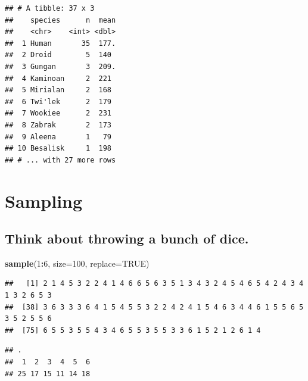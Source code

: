 \documentclass[]{book}
\newenvironment{Shaded}{\begin{snugshade}}{\end{snugshade}}
\newcommand{\DataTypeTok}[1]{\textcolor[rgb]{0.13,0.29,0.53}{#1}}
\newcommand{\DecValTok}[1]{\textcolor[rgb]{0.00,0.00,0.81}{#1}}
\newcommand{\KeywordTok}[1]{\textcolor[rgb]{0.13,0.29,0.53}{\textbf{#1}}}
\newcommand{\NormalTok}[1]{#1}
\newcommand{\OperatorTok}[1]{\textcolor[rgb]{0.81,0.36,0.00}{\textbf{#1}}}
\newcommand{\OtherTok}[1]{\textcolor[rgb]{0.56,0.35,0.01}{#1}}
\newcommand{\StringTok}[1]{\textcolor[rgb]{0.31,0.60,0.02}{#1}}
\begin{document}
\begin{verbatim}
## # A tibble: 37 x 3
##    species      n  mean
##    <chr>    <int> <dbl>
##  1 Human       35  177.
##  2 Droid        5  140 
##  3 Gungan       3  209.
##  4 Kaminoan     2  221 
##  5 Mirialan     2  168 
##  6 Twi'lek      2  179 
##  7 Wookiee      2  231 
##  8 Zabrak       2  173 
##  9 Aleena       1   79 
## 10 Besalisk     1  198 
## # ... with 27 more rows
\end{verbatim}

\hypertarget{sampling}{%
\chapter{Sampling}\label{sampling}}

\hypertarget{think-about-throwing-a-bunch-of-dice.}{%
\section{Think about throwing a bunch of dice.}\label{think-about-throwing-a-bunch-of-dice.}}

\begin{Shaded}
\begin{Highlighting}[]
\KeywordTok{sample}\NormalTok{(}\DecValTok{1}\OperatorTok{:}\DecValTok{6}\NormalTok{, }\DataTypeTok{size=}\DecValTok{100}\NormalTok{, }\DataTypeTok{replace=}\OtherTok{TRUE}\NormalTok{) }
\end{Highlighting}
\end{Shaded}

\begin{verbatim}
##   [1] 2 1 4 5 3 2 2 4 1 4 6 6 5 6 3 5 1 3 4 3 2 4 5 4 6 5 4 2 4 3 4 1 3 2 6 5 3
##  [38] 3 6 3 3 3 6 4 1 5 4 5 5 3 2 2 4 2 4 1 5 4 6 3 4 4 6 1 5 5 6 5 3 5 2 5 5 6
##  [75] 6 5 5 3 5 5 4 3 4 6 5 5 3 5 5 3 3 6 1 5 2 1 2 6 1 4
\end{verbatim}

\begin{Shaded}
\end{Shaded}

\begin{verbatim}
## .
##  1  2  3  4  5  6 
## 25 17 15 11 14 18
\end{verbatim}
\end{document}
